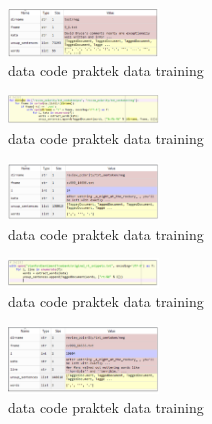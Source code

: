 \begin{enumerate}
\begin{figure}[H]
\includegraphics[width=4cm]{figures/1174002/chapter5/18.png}
\centering
\caption{data code praktek data training }
\label{l2}
\end{figure}

\begin{figure}[H]
\includegraphics[width=4cm]{figures/1174002/chapter5/19.png}
\centering
\caption{data code praktek data training }
\label{l3}
\end{figure}

\begin{figure}[H]
\includegraphics[width=4cm]{figures/1174002/chapter5/20.png}
\centering
\caption{data code praktek data training }
\label{l4}
\end{figure}

\begin{figure}[H]
\includegraphics[width=4cm]{figures/1174002/chapter5/21.png}
\centering
\caption{data code praktek data training }
\label{l5}
\end{figure}

\begin{figure}[H]
\includegraphics[width=4cm]{figures/1174002/chapter5/22.png}
\centering
\caption{data code praktek data training }
\label{l6}
\end{figure}


\end{enumerate}
